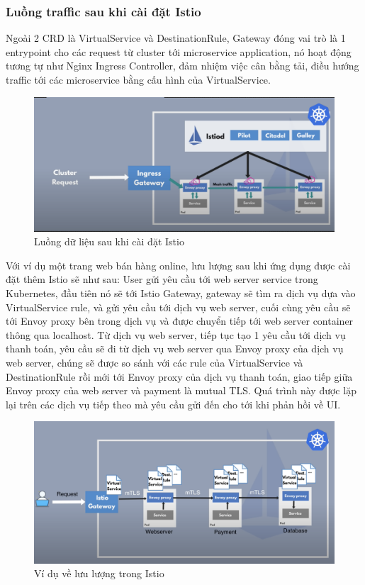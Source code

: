 \documentclass[12pt,a4paper]{report}
\begin{document}
			\subsubsection{Luồng traffic sau khi cài đặt Istio}
		\hspace{0.6cm}Ngoài 2 CRD là VirtualService và DestinationRule, Gateway đóng vai trò là 1 entrypoint cho các request từ cluster tới microservice application, nó hoạt động tương tự như Nginx Ingress Controller, đảm nhiệm việc cân bằng tải, điều hướng traffic tới các microservice bằng cấu hình của VirtualService.
		\begin{figure}[h]
			\centering
			\includegraphics[width=0.7\linewidth]{Pics/2.1.2-p2}
			\caption{Luồng dữ liệu sau khi cài đặt Istio}
			\label{fig:2.1.2-2}
		\end{figure}
		
		\newpage Với ví dụ một trang web bán hàng online, lưu lượng sau khi ứng dụng được cài đặt thêm Istio sẽ như sau: User gửi yêu cầu tới web server service trong Kubernetes, đầu tiên nó sẽ tới Istio Gateway, gateway sẽ tìm ra dịch vụ dựa vào VirtualService rule, và gửi yêu cầu tới dịch vụ web server, cuối cùng yêu cầu sẽ tới Envoy proxy bên trong dịch vụ và được chuyển tiếp tới web server container thông qua localhost. Từ dịch vụ web server, tiếp tục tạo 1 yêu cầu tới dịch vụ thanh toán, yêu cầu sẽ đi từ dịch vụ web server qua Envoy proxy của dịch vụ web server, chúng sẽ được so sánh với các rule của VirtualService và DestinationRule rồi mới tới Envoy proxy của dịch vụ thanh toán, giao tiếp giữa Envoy proxy của web server và payment là mutual TLS. Quá trình này được lặp lại trên các dịch vụ tiếp theo mà yêu cầu gửi đến cho tới khi phản hồi về UI.
		\begin{figure}[h]
			\centering
			\includegraphics[width=0.7\linewidth]{Pics/2.1.2-p3}
			\caption{Ví dụ về lưu lượng trong Istio}
			\label{fig:2.1.2-3}
		\end{figure}
		
\end{document}
